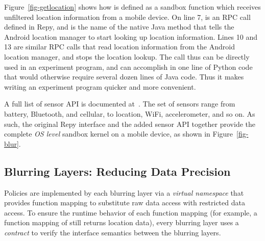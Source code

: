 Figure~\ref{fig-getlocation} shows how  
is defined as a sandbox function which receives unfiltered location 
information from a mobile device. 
On line 7,  is an RPC call 
defined in Repy, 
and  is the name of the native Java method that tells the Android 
location manager to start looking up location information. Lines 10 and 13 are similar RPC 
calls that read location information from the Android location manager, and stops the location 
lookup. The call  thus %
can be directly used in an experiment program, and can 
accomplish in one line of Python code that would otherwise require several dozen 
lines of Java code. Thus it makes writing an experiment program quicker and more convenient.

A full list of sensor API is documented at~\cite{sensor-api}. The set
of sensors range from battery, Bluetooth, and cellular, to location, WiFi, 
accelerometer, and so on. 
As such, the original Repy interface and the added sensor API together 
provide the complete \textit{OS level} sandbox kernel on a mobile 
device, as shown in Figure~\ref{fig-blur}.



\subsection{Blurring Layers: Reducing Data Precision}\label{sec-layer}



Policies are implemented by each blurring layer via a \textit{virtual 
namespace} that provides function mapping to substitute raw 
data access with restricted data access. 
To ensure the runtime behavior of each function mapping (for example, 
a function mapping of  still returns location data), 
every blurring layer uses a \textit{contract} to verify the interface 
semantics between the blurring layers.

